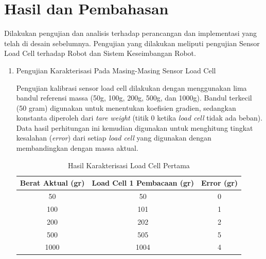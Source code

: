 \section{Hasil dan Pembahasan}
\label{sec:hasildanpembahasan}

Dilakukan pengujian dan analisis terhadap perancangan dan implementasi yang telah di desain sebelumnya. Pengujian yang dilakukan meliputi pengujian Sensor Load Cell terhadap Robot dan Sistem Keseimbangan Robot. 

\begin{enumerate}[label=\Alph*.]

    \item Pengujian Karakterisasi Pada Masing-Masing Sensor Load Cell
    \label{subsec:hasil-pembahasan-karakterisasi}

        \hspace*{1em} Pengujian kalibrasi sensor load cell dilakukan dengan menggunakan lima bandul referensi massa (50g, 100g, 200g, 500g, dan 1000g). Bandul terkecil (50 gram) digunakan untuk menentukan koefisien gradien, sedangkan konstanta diperoleh dari \textit{tare weight} (titik 0 ketika \emph{load cell} tidak ada beban). Data hasil perhitungan ini kemudian digunakan untuk menghitung tingkat kesalahan (\textit{error}) dari setiap \emph{load cell} yang digunakan dengan membandingkan dengan massa aktual. 

        \begin{table}[h]
            \centering
            \caption{Hasil Karakterisasi Load Cell Pertama}
            \begin{tabular}{|c|c|c|}
                \hline
                \textbf{Berat Aktual (gr)} & \textbf{Load Cell 1 Pembacaan (gr)} & \textbf{Error (gr)} \\
                \hline
                50    & 50    & 0   \\
                100   & 101   & 1   \\
                200   & 202   & 2   \\
                500   & 505   & 5   \\
                1000  & 1004  & 4   \\
                \hline
            \end{tabular}
            \label{tab:Kalibrasi_Load_Cell_1}
        \end{table}


\end{enumerate}
